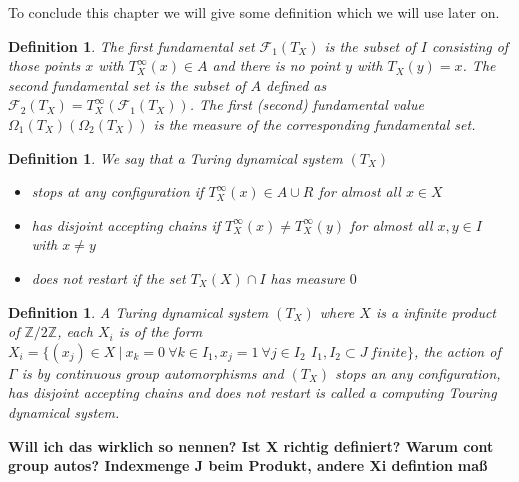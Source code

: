 \documentclass[12pt,a4paper]{scrartcl}
\newtheorem{Definition}[Theorem]{Definition}
\numberwithin{equation}{section}
\newcommand{\2}{\mathbb{Z} / 2 \mathbb{Z}}
\newcommand{\1}{\overline{1}}
\newcommand{\0}{\overline{0}}
\begin{document}
To conclude this chapter we will give some definition which we will use later on. 
\begin{Definition}
	The first fundamental set $\mathcal{F}_1(T_X)$ is the subset of $I$ consisting of those points $x$ with $T_X^\infty(x) \in A$ and there is no point $y$ with $T_X(y)=x$. The second fundamental set is the subset of $A$ defined as $\mathcal{F}_2(T_X)=T_X^\infty(\mathcal{F}_1(T_X))$. The first (second) fundamental value $\Omega_1(T_X) ( \Omega_2(T_X))$ is the measure of the corresponding fundamental set.
\end{Definition}

\begin{Definition}
	We say that a Turing dynamical system $(T_X)$
	\begin{itemize}
		\item stops at any configuration if $T_X^\infty (x) \in A \cup R$ for almost all $x \in X$
		\item has disjoint accepting chains if $T_X^\infty (x) \neq T_X^\infty (y)$ for almost all $x, y \in I$ with $x \neq y$
		\item does not restart if the set $T_X(X) \cap I$ has measure $0$
	\end{itemize}
\end{Definition}

\begin{Definition}
	A Turing dynamical system $(T_X)$ where $X$ is a infinite product of $\2$, each $X_i$ is of the form $X_i = \{(x_j) \in X \ | \ x_k = 0 \ \forall k \in I_1, x_j = 1 \ \forall j \in I_2\, \ I_1, I_2 \subset J \ finite\}$, the action of $\Gamma$ is by continuous group automorphisms and  $(T_X)$ stops an any configuration, has disjoint accepting chains and does not restart is called a computing Touring dynamical system.
\end{Definition}
\textbf{Will ich das wirklich so nennen? Ist X richtig definiert? Warum cont group autos? Indexmenge J beim Produkt, andere Xi defintion}
\textbf{maß}
\end{document}
